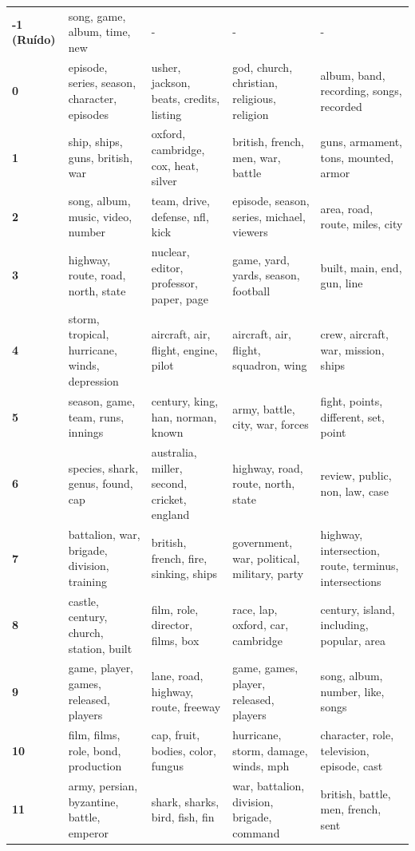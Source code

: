 \begin{xltabular}{\textwidth}{@{}l >{\RaggedRight\arraybackslash}X >{\RaggedRight\arraybackslash}X >{\RaggedRight\arraybackslash}X >{\RaggedRight\arraybackslash}X@{}}
    \textbf{-1 (Ruído)} & song, game, album, time, new & - & - & - \\
    \textbf{0} & episode, series, season, character, episodes & usher, jackson, beats, credits, listing & god, church, christian, religious, religion & album, band, recording, songs, recorded \\
    \textbf{1} & ship, ships, guns, british, war & oxford, cambridge, cox, heat, silver & british, french, men, war, battle & guns, armament, tons, mounted, armor \\
    \textbf{2} & song, album, music, video, number & team, drive, defense, nfl, kick & episode, season, series, michael, viewers & area, road, route, miles, city \\
    \textbf{3} & highway, route, road, north, state & nuclear, editor, professor, paper, page & game, yard, yards, season, football & built, main, end, gun, line \\
    \textbf{4} & storm, tropical, hurricane, winds, depression & aircraft, air, flight, engine, pilot & aircraft, air, flight, squadron, wing & crew, aircraft, war, mission, ships \\
    \textbf{5} & season, game, team, runs, innings & century, king, han, norman, known & army, battle, city, war, forces & fight, points, different, set, point \\
    \textbf{6} & species, shark, genus, found, cap & australia, miller, second, cricket, england & highway, road, route, north, state & review, public, non, law, case \\
    \textbf{7} & battalion, war, brigade, division, training & british, french, fire, sinking, ships & government, war, political, military, party & highway, intersection, route, terminus, intersections \\
    \textbf{8} & castle, century, church, station, built & film, role, director, films, box & race, lap, oxford, car, cambridge & century, island, including, popular, area \\
    \textbf{9} & game, player, games, released, players & lane, road, highway, route, freeway & game, games, player, released, players & song, album, number, like, songs \\
    \textbf{10} & film, films, role, bond, production & cap, fruit, bodies, color, fungus & hurricane, storm, damage, winds, mph & character, role, television, episode, cast \\
    \textbf{11} & army, persian, byzantine, battle, emperor & shark, sharks, bird, fish, fin & war, battalion, division, brigade, command & british, battle, men, french, sent \\

\end{xltabular}
